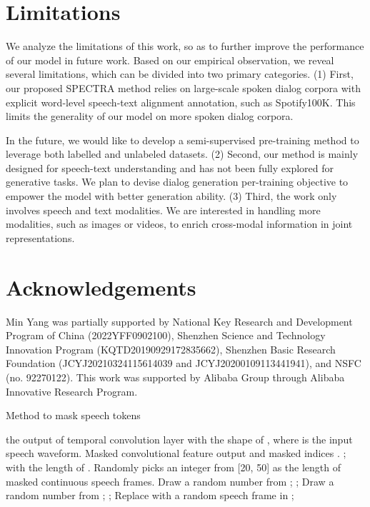 \documentclass[11pt]{article}
\begin{document}
\section*{Limitations}


We analyze the limitations of this work, so as to
further improve the performance of our model in
future work. Based on our empirical observation, we
reveal several limitations, which can be divided
into two primary categories. (1) First, our proposed SPECTRA method relies on large-scale spoken dialog corpora with explicit word-level speech-text alignment annotation, such as Spotify100K. This limits the generality of our model on more spoken dialog corpora. 

In the future, we would like to develop a semi-supervised pre-training method to leverage both labelled and unlabeled datasets. (2) Second, our method is mainly designed for speech-text understanding and has not been fully explored for generative tasks. We plan to devise dialog generation per-training objective to empower the model with better generation ability. (3) Third, the work only involves speech and text modalities. We are interested in handling more modalities, such as images or videos, to enrich cross-modal information in joint representations.






\section*{Acknowledgements}
Min Yang was partially supported by National Key Research and Development Program of China (2022YFF0902100), Shenzhen Science and Technology Innovation Program (KQTD20190929172835662), Shenzhen Basic Research Foundation (JCYJ20210324115614039 and JCYJ20200109113441941), and NSFC (no. 92270122). This work was supported by Alibaba Group through Alibaba Innovative Research Program.



\appendix

\begin{algorithm*}
    \caption{Method to mask speech tokens}
    \begin{algorithmic}[1]
	\Require the output of temporal convolution layer  with the shape of , where  is the input speech waveform.
        \Ensure Masked convolutional feature output  and masked indices .
\State ;  with the length of .
        \State Randomly picks an integer  from [20, 50] as the length of masked continuous speech frames.
	\For{; ; }
            \State Draw a random number  from ;
            \If{}
                \State ;
                    \State Draw a random number  from ;
                    \If{}
                        \State ;
                    \ElsIf{}
                        \State Replace  with a random speech frame in ;
                    \EndIf
                \EndFor
                \State 
            \EndIf
        \EndFor
    \end{algorithmic}
    \label{algo:mam}
\end{algorithm*}
\end{document}
